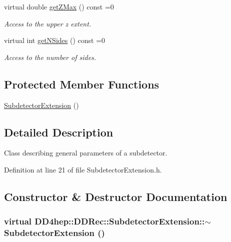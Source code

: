 \begin{DoxyCompactItemize}
virtual double \hyperlink{class_d_d4hep_1_1_d_d_rec_1_1_subdetector_extension_aea56290179f8271d6a2a3be1658d9b47}{getZMax} () const =0
\begin{DoxyCompactList}\small\item\em Access to the upper z extent. \item\end{DoxyCompactList}\item 
virtual int \hyperlink{class_d_d4hep_1_1_d_d_rec_1_1_subdetector_extension_a7bed401e919e8eaaf2dfdf8fe89a3697}{getNSides} () const =0
\begin{DoxyCompactList}\small\item\em Access to the number of sides. \item\end{DoxyCompactList}\end{DoxyCompactItemize}
\subsection*{Protected Member Functions}
\begin{DoxyCompactItemize}
\item 
\hyperlink{class_d_d4hep_1_1_d_d_rec_1_1_subdetector_extension_ae04b137994a497fa056f2cfc84aa0eb9}{SubdetectorExtension} ()
\end{DoxyCompactItemize}


\subsection{Detailed Description}
Class describing general parameters of a subdetector. 

Definition at line 21 of file SubdetectorExtension.h.

\subsection{Constructor \& Destructor Documentation}
\hypertarget{class_d_d4hep_1_1_d_d_rec_1_1_subdetector_extension_aa1aec61c92f4005d502f9419050f1b9b}{
\subsubsection[{$\sim$SubdetectorExtension}]{\setlength{\rightskip}{0pt plus 5cm}virtual DD4hep::DDRec::SubdetectorExtension::$\sim$SubdetectorExtension ()}}
\label{class_d_d4hep_1_1_d_d_rec_1_1_subdetector_extension_aa1aec61c92f4005d502f9419050f1b9b}


